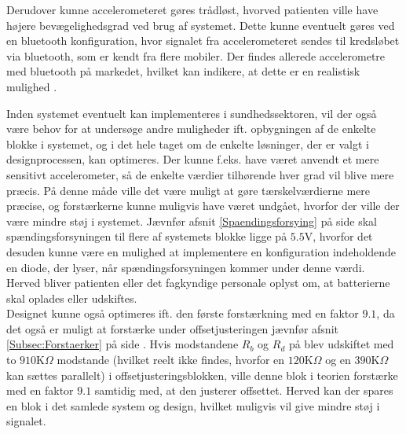 Derudover kunne accelerometeret gøres trådløst, hvorved patienten ville have højere bevægelighedsgrad ved brug af systemet. Dette kunne eventuelt gøres ved en bluetooth konfiguration, hvor signalet fra accelerometeret sendes til kredsløbet via bluetooth, som er kendt fra flere mobiler. Der findes allerede accelerometre med bluetooth på markedet, hvilket kan indikere, at dette er en realistisk mulighed \cite{Axivity2015, Bioradio2015}.

Inden systemet eventuelt kan implementeres i sundhedssektoren, vil der også være behov for at undersøge andre muligheder ift. opbygningen af de enkelte blokke i systemet, og i det hele taget om de enkelte løsninger, der er valgt i designprocessen, kan optimeres. Der kunne f.eks. have været anvendt et mere sensitivt accelerometer, så de enkelte værdier tilhørende hver grad vil blive mere præcis. På denne måde ville det være muligt at gøre tærskelværdierne mere præcise, og forstærkerne kunne muligvis have været undgået, hvorfor der ville der være mindre støj i systemet. Jævnfør afsnit \ref{Spaendingsforsying} på side \pageref{Spaendingsforsying} skal spændingsforsyningen til flere af systemets blokke ligge på $5.5$V, hvorfor det desuden kunne være en mulighed at implementere en konfiguration indeholdende en diode, der lyser, når spændingsforsyningen kommer under denne værdi. Herved bliver patienten eller det fagkyndige personale oplyst om, at batterierne skal oplades eller udskiftes. \\
Designet kunne også optimeres ift. den første forstærkning med en faktor $9.1$, da det også er muligt at forstærke under offsetjusteringen jævnfør afsnit \ref{Subsec:Forstaerker} på side \pageref{Subsec:Forstaerker}. Hvis modstandene $R_{b}$ og $R_{d}$ på  blev udskiftet med to $910$K$\Omega$ modstande (hvilket reelt ikke findes, hvorfor en $120$K$\Omega$ og en $390$K$\Omega$ kan sættes parallelt) i offsetjusteringsblokken, ville denne blok i teorien forstærke med en faktor $9.1$ samtidig med, at den justerer offsettet. Herved kan der spares en blok i det samlede system og design, hvilket muligvis vil give mindre støj i signalet.